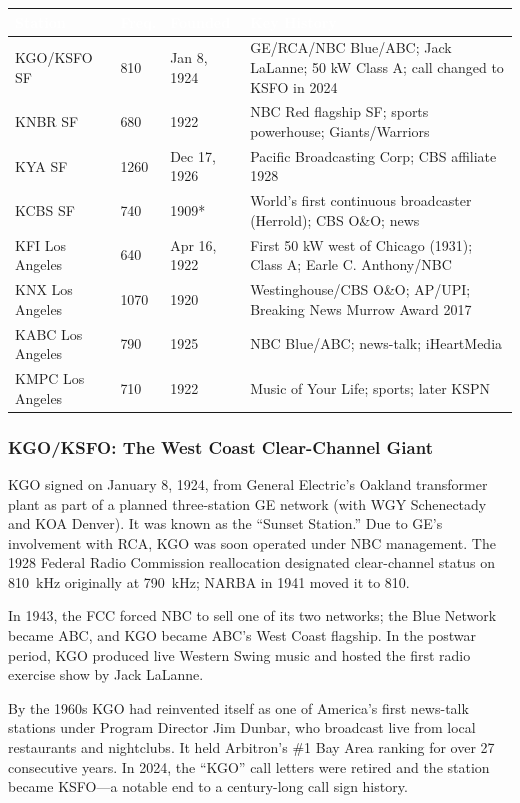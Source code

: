 \documentclass[11pt,letterpaper]{article}
\newcommand{\tableheader}[1]{\textbf{\sffamily\textcolor{white}{#1}}}
\begin{document}
\begin{asciibox}
\begin{center}
\begin{tabularx}{\textwidth}{L{2.5cm}C{1.5cm}L{2.5cm}X}
\toprule
{}
\tableheader{Station} & \tableheader{Freq.} & \tableheader{Founded} & \tableheader{Key History} \\
\midrule
KGO/KSFO SF & 810 & Jan 8, 1924 & GE/RCA/NBC Blue/ABC; Jack LaLanne; 50 kW Class A; call changed to KSFO in 2024 \\
KNBR SF & 680 & 1922 & NBC Red flagship SF; sports powerhouse; Giants/Warriors \\
KYA SF & 1260 & Dec 17, 1926 & Pacific Broadcasting Corp; CBS affiliate 1928 \\
KCBS SF & 740 & 1909* & World's first continuous broadcaster (Herrold); CBS O\&O; news \\
KFI Los Angeles & 640 & Apr 16, 1922 & First 50 kW west of Chicago (1931); Class A; Earle C. Anthony/NBC \\
KNX Los Angeles & 1070 & 1920 & Westinghouse/CBS O\&O; AP/UPI; Breaking News Murrow Award 2017 \\
KABC Los Angeles & 790 & 1925 & NBC Blue/ABC; news-talk; iHeartMedia \\
KMPC Los Angeles & 710 & 1922 & Music of Your Life; sports; later KSPN \\
\bottomrule
\end{tabularx}
\end{center}

\subsubsection{KGO/KSFO: The West Coast Clear-Channel Giant}

KGO signed on January 8, 1924, from General Electric's Oakland transformer plant as part of a
planned three-station GE network (with WGY Schenectady and KOA Denver). It was known as the
``Sunset Station.'' Due to GE's involvement with RCA, KGO was soon operated under NBC management.
The 1928 Federal Radio Commission reallocation designated clear-channel status on 810~kHz
originally at 790~kHz; NARBA in 1941 moved it to 810.

In 1943, the FCC forced NBC to sell one of its two networks; the Blue Network became ABC, and
KGO became ABC's West Coast flagship. In the postwar period, KGO produced live Western Swing
music and hosted the first radio exercise show by Jack LaLanne.

By the 1960s KGO had reinvented itself as one of America's first news-talk stations under Program
Director Jim Dunbar, who broadcast live from local restaurants and nightclubs. It held Arbitron's
\#1 Bay Area ranking for over 27 consecutive years. In 2024, the ``KGO'' call letters were retired
and the station became KSFO---a notable end to a century-long call sign history.


\end{asciibox}
\end{document}

